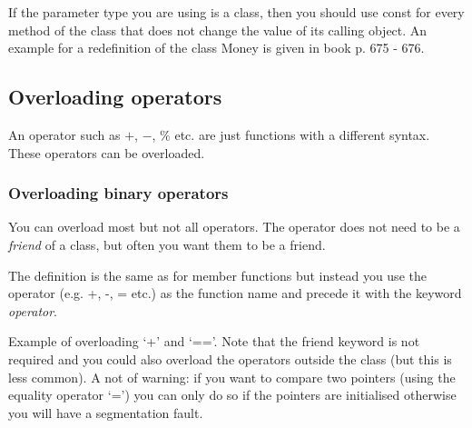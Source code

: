 If the parameter type you are using is a class, then you should use const for every method of the
class that does not change the value of its calling object. An example for a redefinition of the
class Money is given in book p. 675 - 676.






\subsection{Overloading operators}
An operator such as $+$, $-$, $\%$ etc. are just functions with a different syntax. These operators
can be overloaded.

\subsubsection{Overloading binary operators}
You can overload most but not all operators. The operator does not need to be a \emph{friend}
of a class, but often you want them to be a friend.

The definition is the same as for member functions but instead you use the operator (e.g. +,
-, = etc.) as the function name and precede it with the keyword \emph{operator}.

\noindent
Example of overloading `+' and `=='. Note that the friend keyword is not required and you could
also overload the operators outside the class (but this is less common). A not of warning: if you
want to compare two pointers (using the equality operator `=') you can only do so if the
pointers are initialised otherwise you will have a segmentation fault.

